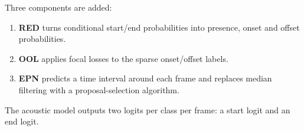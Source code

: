 Three components are added:
\begin{enumerate}
\item \textbf{RED} turns conditional start/end probabilities into presence,
      onset and offset probabilities.
\item \textbf{OOL} applies focal losses to the sparse onset/offset labels.
\item \textbf{EPN} predicts a time interval around each frame and replaces
      median filtering with a proposal-selection algorithm.
\end{enumerate}
The acoustic model outputs two logits per class per frame: a start logit and an
end logit.
